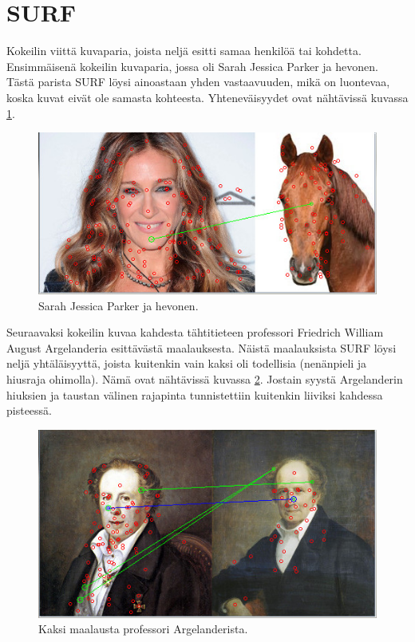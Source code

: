 \documentclass[12pt,a4paper,titlepage]{article}
\begin{document}
\section{SURF}
Kokeilin viittä kuvaparia, joista neljä esitti samaa henkilöä tai kohdetta. Ensimmäisenä kokeilin kuvaparia, jossa oli Sarah Jessica Parker ja hevonen. Tästä parista SURF löysi ainoastaan yhden vastaavuuden, mikä on luontevaa, koska kuvat eivät ole samasta kohteesta. Yhteneväisyydet ovat nähtävissä kuvassa \ref{parker}.

\begin{figure}
\centering 
\includegraphics[width=\textwidth]{kuvat/sarahhorse.jpg}
\caption{Sarah Jessica Parker ja hevonen.}
\label{parker}
\end{figure}

Seuraavaksi kokeilin kuvaa kahdesta tähtitieteen professori Friedrich William August Argelanderia esittävästä maalauksesta. Näistä maalauksista SURF löysi neljä yhtäläisyyttä, joista kuitenkin vain kaksi oli todellisia (nenänpieli ja hiusraja ohimolla). Nämä ovat nähtävissä kuvassa \ref{argelander}. Jostain syystä Argelanderin hiuksien ja taustan välinen rajapinta tunnistettiin kuitenkin liiviksi kahdessa pisteessä.

\begin{figure}
\centering 
\includegraphics[width=\textwidth]{kuvat/argelander.jpg}
\caption{Kaksi maalausta professori Argelanderista.}
\label{argelander}
\end{figure}
\end{document}
